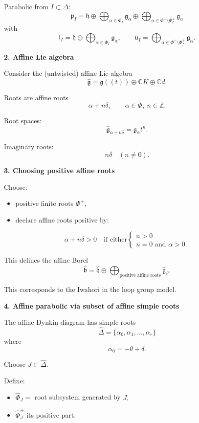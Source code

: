 \documentclass[12pt]{article}
\begin{document}
Parabolic from $I\subset\Delta$:
\[
\mathfrak{p}_I
=
\mathfrak{h}
\oplus
\bigoplus_{\alpha\in\Phi_I}
\mathfrak{g}_\alpha
\oplus
\bigoplus_{\alpha\in\Phi^+\setminus\Phi_I^+}
\mathfrak{g}_\alpha
\]
with
\[
\mathfrak{l}_I
=
\mathfrak{h}
\oplus
\bigoplus_{\alpha\in\Phi_I}
\mathfrak{g}_\alpha,
\qquad
\mathfrak{u}_I
=
\bigoplus_{\alpha\in\Phi^+\setminus\Phi_I^+}
\mathfrak{g}_\alpha.
\]

\medskip

\noindent\textbf{2. Affine Lie algebra}

Consider the (untwisted) affine Lie algebra
\[
\widehat{\mathfrak{g}}
=
\mathfrak{g}((t))
\oplus
\mathbb{C} K
\oplus
\mathbb{C} d.
\]

Roots are affine roots
\[
\alpha + n\delta,
\qquad
\alpha\in\Phi,\ n\in\mathbb{Z}.
\]

Root spaces:
\[
\widehat{\mathfrak{g}}_{\alpha+n\delta}
=
\mathfrak{g}_\alpha t^n.
\]

Imaginary roots:
\[
n\delta \quad (n\neq 0).
\]

\medskip

\noindent\textbf{3. Choosing positive affine roots}

Choose:
\begin{itemize}
    \item positive finite roots $\Phi^+$,
    \item declare affine roots positive by:
\end{itemize}
\[
\alpha+n\delta > 0
\quad \text{if either}
\begin{cases}
n>0\\
n=0 \text{ and } \alpha>0.
\end{cases}
\]

This defines the affine Borel
\[
\widehat{\mathfrak{b}}
=
\widehat{\mathfrak{h}}
\oplus
\bigoplus_{\text{positive affine roots}}
\widehat{\mathfrak{g}}_\beta.
\]

This corresponds to the Iwahori in the loop group model.

\medskip

\noindent\textbf{4. Affine parabolic via subset of affine simple roots}

The affine Dynkin diagram has simple roots
\[
\widehat{\Delta}
=
\{\alpha_0,\alpha_1,\dots,\alpha_r\}
\]
where
\[
\alpha_0 = -\theta + \delta.
\]

Choose $J\subset \widehat{\Delta}$.

Define:
\begin{itemize}
    \item $\widehat{\Phi}_J =$ root subsystem generated by $J$,
    \item $\widehat{\Phi}_J^+$ its positive part.
\end{itemize}
\end{document}
